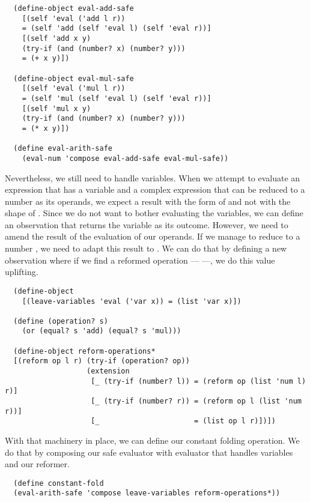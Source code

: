 \begin{verbatim} 
  (define-object eval-add-safe
    [(self 'eval ('add l r))
    = (self 'add (self 'eval l) (self 'eval r))]
    [(self 'add x y)
    (try-if (and (number? x) (number? y)))
    = (+ x y)])

  (define-object eval-mul-safe
    [(self 'eval ('mul l r))
    = (self 'mul (self 'eval l) (self 'eval r))]
    [(self 'mul x y)
    (try-if (and (number? x) (number? y)))
    = (* x y)])

  (define eval-arith-safe
    (eval-num 'compose eval-add-safe eval-mul-safe))
\end{verbatim}

Nevertheless, we still need to handle variables.
When we attempt to evaluate an expression that has a variable and a complex expression that can be reduced to a number as its operands, we expect a result with the form of  and not with the shape of . 
Since we do not want to bother evaluating the variables, we can define an observation that returns the variable as its outcome.
However, we need to amend the result of the evaluation of our operands.
If we manage to reduce to a number , we need to adapt this result to . 
We can do that by defining a new observation where if we find a reformed operation  ---  ---, we do this value uplifting.

\begin{verbatim}
  (define-object
    [(leave-variables 'eval ('var x)) = (list 'var x)])

  (define (operation? s)
    (or (equal? s 'add) (equal? s 'mul)))

  (define-object reform-operations*
  [(reform op l r) (try-if (operation? op))
                   (extension
                    [_ (try-if (number? l)) = (reform op (list 'num l) r)]
                    [_ (try-if (number? r)) = (reform op l (list 'num r))]
                    [_                      = (list op l r)])])
\end{verbatim}

With that machinery in place, we can define our constant folding operation.
We do that by composing our safe evaluator with evaluator that handles variables and our reformer. 

\begin{verbatim}
  (define constant-fold
  (eval-arith-safe 'compose leave-variables reform-operations*))
\end{verbatim}
